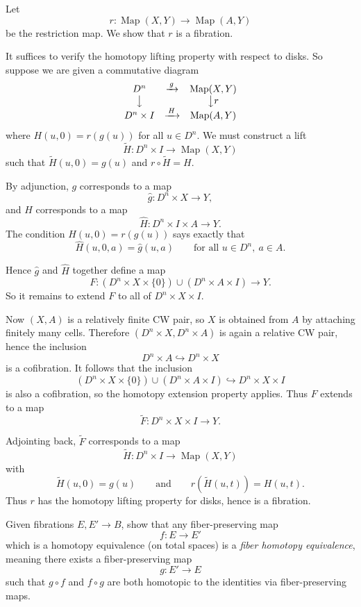 \documentclass[12pt]{article}
\begin{document}
\begin{solution}
Let
\[
r:\operatorname{Map}(X,Y)\to \operatorname{Map}(A,Y)
\]
be the restriction map. We show that \(r\) is a fibration.

It suffices to verify the homotopy lifting property with respect to disks. So suppose we are given a commutative diagram
\[
\begin{array}{ccc}
D^n & \xrightarrow{\,g\,} & \operatorname{Map}(X,Y) \\
\big\downarrow && \big\downarrow r \\
D^n\times I & \xrightarrow{\,H\,} & \operatorname{Map}(A,Y)
\end{array}
\]
where \(H(u,0)=r(g(u))\) for all \(u\in D^n\). We must construct a lift
\[
\widetilde H:D^n\times I\to \operatorname{Map}(X,Y)
\]
such that \(\widetilde H(u,0)=g(u)\) and \(r\circ \widetilde H=H\).

By adjunction, \(g\) corresponds to a map
\[
\widehat g:D^n\times X\to Y,
\]
and \(H\) corresponds to a map
\[
\widehat H:D^n\times I\times A\to Y.
\]
The condition \(H(u,0)=r(g(u))\) says exactly that
\[
\widehat H(u,0,a)=\widehat g(u,a)
\qquad
\text{for all }u\in D^n,\ a\in A.
\]

Hence \(\widehat g\) and \(\widehat H\) together define a map
\[
F:(D^n\times X\times\{0\})\cup(D^n\times A\times I)\to Y.
\]
So it remains to extend \(F\) to all of \(D^n\times X\times I\).

Now \((X,A)\) is a relatively finite CW pair, so \(X\) is obtained from \(A\) by attaching finitely many cells. Therefore \((D^n\times X,D^n\times A)\) is again a relative CW pair, hence the inclusion
\[
D^n\times A\hookrightarrow D^n\times X
\]
is a cofibration. It follows that the inclusion
\[
(D^n\times X\times\{0\})\cup(D^n\times A\times I)
\hookrightarrow
D^n\times X\times I
\]
is also a cofibration, so the homotopy extension property applies. Thus \(F\) extends to a map
\[
\widetilde F:D^n\times X\times I\to Y.
\]

Adjointing back, \(\widetilde F\) corresponds to a map
\[
\widetilde H:D^n\times I\to \operatorname{Map}(X,Y)
\]
with
\[
\widetilde H(u,0)=g(u)
\qquad\text{and}\qquad
r(\widetilde H(u,t))=H(u,t).
\]
Thus \(r\) has the homotopy lifting property for disks, hence is a fibration.
\end{solution}
\begin{problem}[4]
Given fibrations \(E,E'\to B\), show that any fiber-preserving map
\[
f:E\to E'
\]
which is a homotopy equivalence (on total spaces) is a \emph{fiber homotopy equivalence}, meaning there exists a fiber-preserving map
\[
g:E'\to E
\]
such that \(g\circ f\) and \(f\circ g\) are both homotopic to the identities via fiber-preserving maps.
\end{problem}
\end{document}
